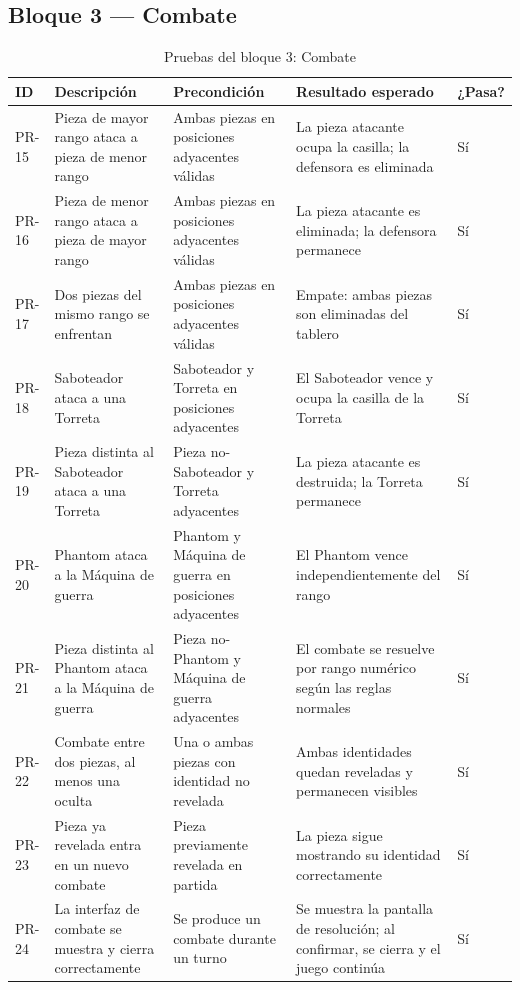 \clearpage

\subsection{Bloque 3 — Combate}

\begin{table}[H]
	\centering
	\small
	\begin{tabular}{|>{\centering\arraybackslash}p{1cm}|>{\centering\arraybackslash}p{4cm}|>{\centering\arraybackslash}p{4cm}|>{\centering\arraybackslash}p{4cm}|>{\centering\arraybackslash}p{1.5cm}|}
		\hline
		\textbf{ID} & \textbf{Descripción} & \textbf{Precondición} & \textbf{Resultado esperado} & \textbf{¿Pasa?} \\
		\hline
		PR-15 & Pieza de mayor rango ataca a pieza de menor rango & Ambas piezas en posiciones adyacentes válidas & La pieza atacante ocupa la casilla; la defensora es eliminada & \cellcolor{green!40}Sí \\
		\hline
		PR-16 & Pieza de menor rango ataca a pieza de mayor rango & Ambas piezas en posiciones adyacentes válidas & La pieza atacante es eliminada; la defensora permanece & \cellcolor{green!40}Sí \\
		\hline
		PR-17 & Dos piezas del mismo rango se enfrentan & Ambas piezas en posiciones adyacentes válidas & Empate: ambas piezas son eliminadas del tablero & \cellcolor{green!40}Sí \\
		\hline
		PR-18 & Saboteador ataca a una Torreta & Saboteador y Torreta en posiciones adyacentes & El Saboteador vence y ocupa la casilla de la Torreta & \cellcolor{green!40}Sí \\
		\hline
		PR-19 & Pieza distinta al Saboteador ataca a una Torreta & Pieza no-Saboteador y Torreta adyacentes & La pieza atacante es destruida; la Torreta permanece & \cellcolor{green!40}Sí \\
		\hline
		PR-20 & Phantom ataca a la Máquina de guerra & Phantom y Máquina de guerra en posiciones adyacentes & El Phantom vence independientemente del rango & \cellcolor{green!40}Sí \\
		\hline
		PR-21 & Pieza distinta al Phantom ataca a la Máquina de guerra & Pieza no-Phantom y Máquina de guerra adyacentes & El combate se resuelve por rango numérico según las reglas normales & \cellcolor{green!40}Sí \\
		\hline
		PR-22 & Combate entre dos piezas, al menos una oculta & Una o ambas piezas con identidad no revelada & Ambas identidades quedan reveladas y permanecen visibles & \cellcolor{green!40}Sí \\
		\hline
		PR-23 & Pieza ya revelada entra en un nuevo combate & Pieza previamente revelada en partida & La pieza sigue mostrando su identidad correctamente & \cellcolor{green!40}Sí \\
		\hline
		PR-24 & La interfaz de combate se muestra y cierra correctamente & Se produce un combate durante un turno & Se muestra la pantalla de resolución; al confirmar, se cierra y el juego continúa & \cellcolor{green!40}Sí \\
		\hline
	\end{tabular}
	\caption{Pruebas del bloque 3: Combate}
\end{table}

